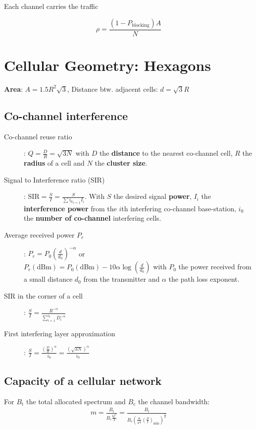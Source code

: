 \documentclass[11pt, a4paper,twocolumn]{scrartcl}
\begin{document}
Each channel carries the traffic 

\begin{equation}
	\rho = \frac{(1 - P_\textrm{blocking})A}{N}
\end{equation}

\section{Cellular Geometry: Hexagons}

\textbf{Area}: $A=1.5R^2\sqrt{3}$, Distance btw. adjacent cells: $d=\sqrt{3}R$

\subsection{Co-channel interference}
\begin{description}
\item[Co-channel reuse ratio]: $Q = \frac{D}{R} = \sqrt{3N}$ with $D$ the \textbf{distance} to the nearest co-channel cell, $R$ the \textbf{radius} of a cell and $N$ the \textbf{cluster size}.

\item[Signal to Interference ratio (SIR)]: $\textrm{SIR} = \frac{S}{I} = \frac{S}{\sum{i_0}_{i=1}I_i}$. With $S$ the desired signal \textbf{power}, $I_i$ the \textbf{interference power} from the $i$th interfering co-channel base-station, $i_0$ the \textbf{number of co-channel} interfering cells.

\item[Average received power $P_r$]: $P_r = P_0(\frac{d}{d_0})^{-\alpha}$ or \\ 
$P_r(\textrm{dBm}) = P_0(\textrm{dBm})-10\alpha\log(\frac{d}{d_0})$ with $P_0$ the power received from a small distance $d_0$ from the transmitter and $\alpha$ the path loss exponent.
	
\item[SIR in the corner of a cell]: $\frac{S}{I} = \frac{R^{-\alpha}}{\sum^{i_0}_{i=1}D_i^{-\alpha}}$

\item[First interfering layer approximation]: $\frac{S}{I} = \frac{(\frac{D}{R})^\alpha}{i_0} = \frac{(\sqrt{3N})^\alpha}{i_0}$

\end{description}

\subsection{Capacity of a cellular network}
For $B_\textrm{t}$ the total allocated spectrum and $B_\textrm{c}$ the channel bandwidth: 
\begin{align}
m = \frac{B_t}{B_c \frac{Q^2}{3}} = \frac{B_t}{B_c(\frac{6}{3^{\frac{\alpha}{2}}}(\frac{S}{I})_\textrm{min})^{\frac{2}{\alpha}}}
\end{align}
\end{document}
